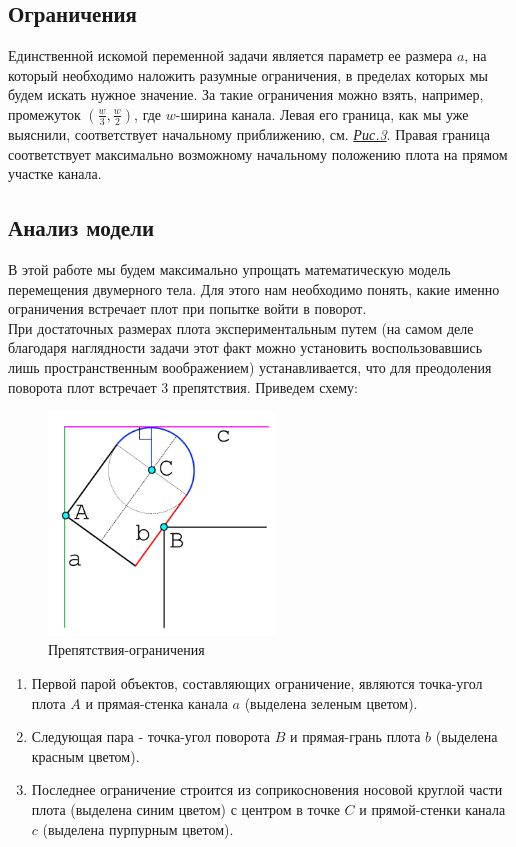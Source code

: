 \documentclass[12pt,a4paper]{article}
\begin{document}
		\subsection{Ограничения}\label{subsec:limitations}
			Единственной искомой переменной задачи является параметр ее размера $a$, на который необходимо наложить разумные ограничения, в пределах которых мы будем искать нужное значение. За такие ограничения можно взять, например, промежуток $(\frac{w}{3}, \frac{w}{2})$, где $w$-ширина канала. Левая его граница, как мы уже выяснили, соответствует начальному приближению, см. \hyperref[fig:example]{\textit{Рис.3}}. Правая граница соответствует максимально возможному начальному положению плота на прямом участке канала.
		
		\subsection{Анализ модели}
			В этой работе мы будем максимально упрощать математическую модель перемещения двумерного тела. Для этого нам необходимо понять, какие именно ограничения встречает плот при попытке войти в поворот.\\
			
			При достаточных размерах плота экспериментальным путем (на самом деле благодаря наглядности задачи этот факт можно установить воспользовавшись лишь пространственным воображением) устанавливается, что для преодоления поворота плот встречает 3 препятствия. Приведем схему:
			\begin{figure}[H]\label{fig:edges}
				\centering
				\includegraphics[width=6cm]{res/edges.png}
				\caption{Препятствия-ограничения}
			\end{figure}
			\begin{enumerate}
				\item Первой парой объектов, составляющих ограничение, являются точка-угол плота $A$ и прямая-стенка канала $a$ (выделена зеленым цветом).
				\item Следующая пара - точка-угол поворота $B$ и прямая-грань плота $b$ (выделена красным цветом).
				\item Последнее ограничение строится из соприкосновения носовой круглой части плота (выделена синим цветом) с центром в точке $C$ и прямой-стенки канала $c$ (выделена пурпурным цветом).
			\end{enumerate}
		
\end{document}
